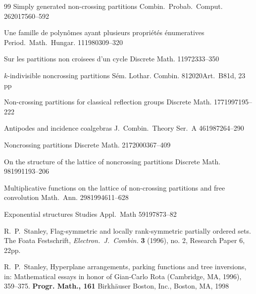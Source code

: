 \documentclass[11pt]{amsart}
\numberwithin{equation}{section}
\begin{document}
\begin{thebibliography}{99}
              {Simply generated non-crossing partitions} 
              {Combin.\ Probab.\ Comput.\ }
              {26}{2017}{560--592}

              {Une famille de polyn\^omes ayant plusieurs propri\'et\'es
                \'enumeratives}  
              {Period.\ Math.\ Hungar.}
              {11}{1980}{309--320}
              
              {Sur les partitions non croisees d'un cycle} 
              {Discrete Math.}
              {1}{1972}{333--350}

              {$k$-indivisible noncrossing partitions}
              {S\'em. Lothar. Combin.}
              {81}{2020}{Art.\ B81d, 23 pp}

            {Non-crossing partitions for classical reflection groups}
            {Discrete Math.}
            {177}{1997}{195--222}

            {Antipodes and incidence coalgebras}
            {J.\ Combin.\ Theory Ser.\ A} 
            {46}{1987}{264--290}

		{Noncrossing partitions}
		{Discrete Math.}
		{217}{2000}{367--409}

		{On the structure of the lattice of noncrossing partitions}
		{Discrete Math.}
		{98}{1991}{193--206}

            {Multiplicative functions on the lattice of non-crossing partitions and free convolution}
            {Math.\ Ann.}
             {298}{1994}{611--628}

            {Exponential structures}
            {Studies Appl.\ Math}
            {59}{1978}{73--82}

{\sc R.\ P.\ Stanley},
Flag-symmetric and locally rank-symmetric partially ordered sets.
The Foata Festschrift,
{\em Electron.\ J.\ Combin.}
{\bf 3} (1996), no. 2, Research Paper 6, 22pp.

R.\ P.\  Stanley,
Hyperplane arrangements, parking functions and tree inversions,
in: Mathematical essays in honor of Gian-Carlo Rota (Cambridge, MA,
1996), 359--375. {\bf Progr. Math., 161}
Birkh\"auser Boston, Inc., Boston, MA, 1998
  


\end{thebibliography}
\end{document}
